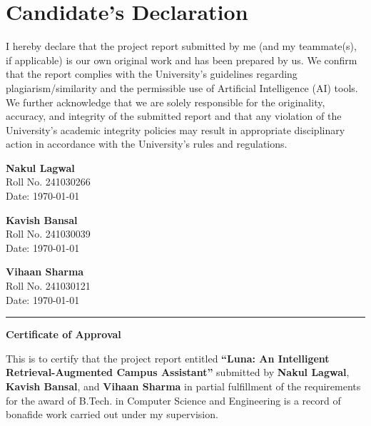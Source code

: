 \documentclass[12pt,a4paper]{article}
\begin{document}
\newpage
{}

\section*{Candidate's Declaration}

\noindent I hereby declare that the project report submitted by me (and my teammate(s), if applicable) is our own original work and has been prepared by us. We confirm that the report complies with the University's guidelines regarding plagiarism/similarity and the permissible use of Artificial Intelligence (AI) tools. We further acknowledge that we are solely responsible for the originality, accuracy, and integrity of the submitted report and that any violation of the University's academic integrity policies may result in appropriate disciplinary action in accordance with the University's rules and regulations.

\vspace{2.5cm}

\noindent\begin{minipage}[t]{0.45\textwidth}
    \textbf{Nakul Lagwal} \\
    Roll No. 241030266 \\
    Date: \today
\end{minipage}
\hfill
\begin{minipage}[t]{0.45\textwidth}
    \textbf{Kavish Bansal} \\
    Roll No. 241030039 \\
    Date: \today
\end{minipage}

\vspace{1.5cm}

\noindent\begin{minipage}[t]{0.45\textwidth}
    \textbf{Vihaan Sharma} \\
    Roll No. 241030121 \\
    Date: \today
\end{minipage}

\vspace{3cm}
\hrule
\vspace{0.5cm}
\begin{center}
    \textbf{Certificate of Approval}
\end{center}
\noindent This is to certify that the project report entitled \textbf{``Luna: An Intelligent Retrieval-Augmented Campus Assistant''} submitted by \textbf{Nakul Lagwal}, \textbf{Kavish Bansal}, and \textbf{Vihaan Sharma} in partial fulfillment of the requirements for the award of B.Tech. in Computer Science and Engineering is a record of bonafide work carried out under my supervision.
\end{document}

